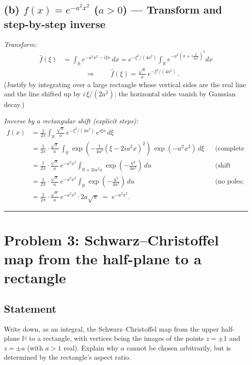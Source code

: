 \documentclass[11pt]{article}
\begin{document}
	\subsection*{(b) \(f(x)=e^{-a^{2}x^{2}}\) (\(a>0\)) — Transform and step-by-step inverse}
	\textit{Transform:}
	\begin{align*}
		\widehat f(\xi)
		&=\int_{\mathbb R}e^{-a^{2}x^{2}-i\xi x}\,dx
		= e^{-\xi^{2}/(4a^{2})}\int_{\mathbb R}e^{-a^{2}\left(x+i\frac{\xi}{2a^{2}}\right)^{2}}dx\\
		&\phantom{=} \qquad \Rightarrow\qquad
		\boxed{\,\widehat f(\xi)=\frac{\sqrt{\pi}}{a}\,e^{-\xi^{2}/(4a^{2})}\, }.
	\end{align*}
	(Justify by integrating over a large rectangle whose vertical sides are the real line and
	the line shifted up by \(i\,\xi/(2a^{2})\); the horizontal sides vanish by Gaussian decay.)
	
	\textit{Inverse by a rectangular shift (explicit steps):}
	\begin{align*}
		f(x)
		&=\frac{1}{2\pi}\int_{\mathbb R}\frac{\sqrt{\pi}}{a}\,e^{-\xi^{2}/(4a^{2})}\,e^{i\xi x}\,d\xi\\
		&=\frac{1}{2\pi}\cdot\frac{\sqrt{\pi}}{a}\,
		\int_{\mathbb R} \exp\!\left(-\frac{1}{4a^{2}}(\xi-2ia^{2}x)^{2}\right)\,
		\exp\!\left(-a^{2}x^{2}\right)\,d\xi
		&&\text{(complete the square)}\\
		&=\frac{1}{2\pi}\cdot\frac{\sqrt{\pi}}{a}\,e^{-a^{2}x^{2}}
		\int_{\mathbb R+2ia^{2}x} \exp\!\left(-\frac{u^{2}}{4a^{2}}\right)\,du
		&&\text{(shift contour vertically)}\\
		&=\frac{1}{2\pi}\cdot\frac{\sqrt{\pi}}{a}\,e^{-a^{2}x^{2}}
		\int_{\mathbb R} \exp\!\left(-\frac{u^{2}}{4a^{2}}\right)\,du
		&&\text{(no poles; horizontal sides vanish)}\\
		&=\frac{1}{2\pi}\cdot\frac{\sqrt{\pi}}{a}\,e^{-a^{2}x^{2}}\cdot 2a\sqrt{\pi}
		\;=\;e^{-a^{2}x^{2}}.
	\end{align*}
	
	\bigskip\hrule\bigskip
	
	\section{Problem 3: Schwarz--Christoffel map from the half-plane to a rectangle}
	
	\subsection*{Statement}
	Write down, as an integral, the Schwarz--Christoffel map from the upper half-plane \(\mathbb H\) to a rectangle,
	with vertices being the images of the points \(z=\pm1\) and \(z=\pm a\) (with \(a>1\) real).
	Explain why \(a\) cannot be chosen arbitrarily, but is determined by the rectangle’s aspect ratio.
	
\end{document}
